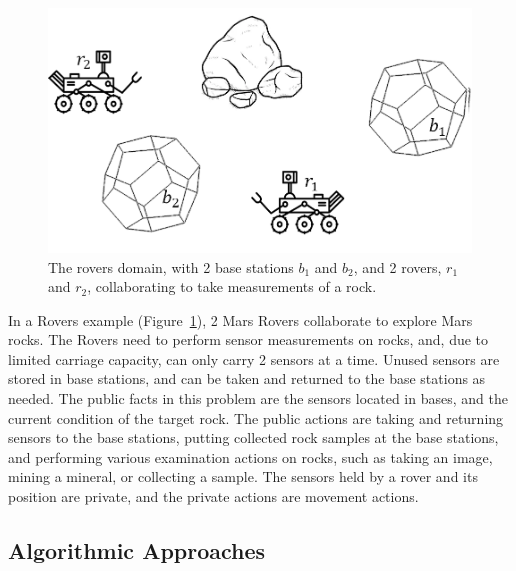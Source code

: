 \documentclass{article}
\theoremstyle{remark}
\begin{document}
	
\begin{figure}
    \centering
    \includegraphics[scale=0.3]{RoversDomain}
    \caption{The rovers domain,  with 2 base stations $b_1$ and $b_2$, and 2 rovers, $r_1$ and $r_2$,   collaborating to take measurements of a rock.}
    \label{fig:RoversDomain}
\end{figure}
	
In a Rovers example (Figure~\ref{fig:RoversDomain}), 2 Mars Rovers collaborate to explore Mars rocks. The Rovers need to perform sensor measurements on rocks, and, due to limited carriage capacity, can only carry 2 sensors at a time. Unused sensors are stored in base stations, and can be taken and returned to the base stations as needed. 
The public facts in this problem are the sensors located in bases, and the current condition of the target rock. The public actions are taking and returning sensors to the base stations, putting collected rock samples at the base stations, and performing various examination actions on rocks, such as taking an image, mining a mineral, or collecting a sample. The sensors held by a rover and its position are private, and the private actions are movement actions.



\subsection{Algorithmic Approaches}
\end{document}
